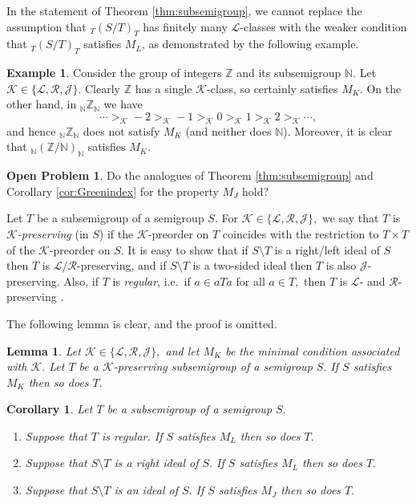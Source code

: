 \documentclass[twoside,a4paper,12pt,reqno]{amsart}
\theoremstyle{plain}
\newtheorem{cor}[thm]{Corollary}
\newtheorem{lem}[thm]{Lemma}
\theoremstyle{definition}
\newtheorem{ex}[thm]{Example}
\newtheorem{op}[thm]{Open Problem}
\renewcommand{\l}{\mbox{${\mathcal{L}}$}}
\renewcommand{\r}{\mbox{${\mathcal{R}}$}}
\renewcommand{\j}{\mbox{${\mathcal{J}}$}}
\renewcommand{\k}{\mbox{${\mathcal{K}}$}}
\newcommand{\gk}{>_{\mathcal{K}}}
\newcommand{\N}{\mathbb{N}}
\newcommand{\Z}{\mathbb{Z}}
\newcommand{\sm}{\setminus}
\begin{document}
In the statement of Theorem \ref{thm:subsemigroup}, we cannot replace the assumption that ${_T}(S/T)_T$ has finitely many $\l$-classes with the weaker condition that ${_T}(S/T)_T$ satisfies $M_L$, as demonstrated by the following example.

\begin{ex}\label{ex:subsemigroup}
Consider the group of integers $\Z$ and its subsemigroup $\N.$  Let $\k\in\{\l,\r,\j\}.$  Clearly $\Z$ has a single $\k$-class, so certainly satisfies $M_K$.  On the other hand, in ${_\N}\Z_{\N}$ we have
$$\cdots\gk-2\gk-1\gk0\gk1\gk2\gk\cdots,$$
and hence ${_\N}\Z_{\N}$ does not satisfy $M_K$ (and neither does $\N$).  Moreover, it is clear that ${_\N}(\Z/\N)_{\N}$ satisfies $M_K$.
\end{ex}

\begin{op} 
Do the analogues of Theorem \ref{thm:subsemigroup} and Corollary \ref{cor:Greenindex} for the property $M_J$ hold?
\end{op}

Let $T$ be a subsemigroup of a semigroup $S.$  For $\k\in\{\l,\r,\j\},$ we say that $T$ is {\em$\k$-preserving} (in $S$) if the $\k$-preorder on $T$ coincides with the restriction to $T\times T$ of the $\k$-preorder on $S.$  It is easy to show that if $S{\sm}T$ is a right/left ideal of $S$ then $T$ is $\l$/$\r$-preserving, and if $S{\sm}T$ is a two-sided ideal then $T$ is also $\j$-preserving.  Also, if $T$ is {\em regular}, i.e.\ if $a\in aTa$ for all $a\in T,$ then $T$ is $\l$- and $\r$-preserving \cite[Lemma 3]{East}.  

The following lemma is clear, and the proof is omitted.

\begin{lem}\label{lem:preserving}
Let $\k\in\{\l,\r,\j\},$ and let $M_K$ be the minimal condition associated with $\k.$  Let $T$ be a $\k$-preserving subsemigroup of a semigroup $S.$  If $S$ satisfies $M_K$ then so does $T.$
\end{lem}

\begin{cor}\label{cor:preserving}
Let $T$ be a subsemigroup of a semigroup $S.$
\begin{enumerate}[leftmargin=*]
\item[\emph{(1)}] Suppose that $T$ is regular.  If $S$ satisfies $M_L$ then so does $T.$
\item[\emph{(2)}] Suppose that $S{\sm}T$ is a right ideal of $S.$  If $S$ satisfies $M_L$ then so does $T.$
\item[\emph{(3)}] Suppose that $S{\sm}T$ is an ideal of $S.$  If $S$ satisfies $M_J$ then so does $T.$
\end{enumerate}
\end{cor}
\end{document}
